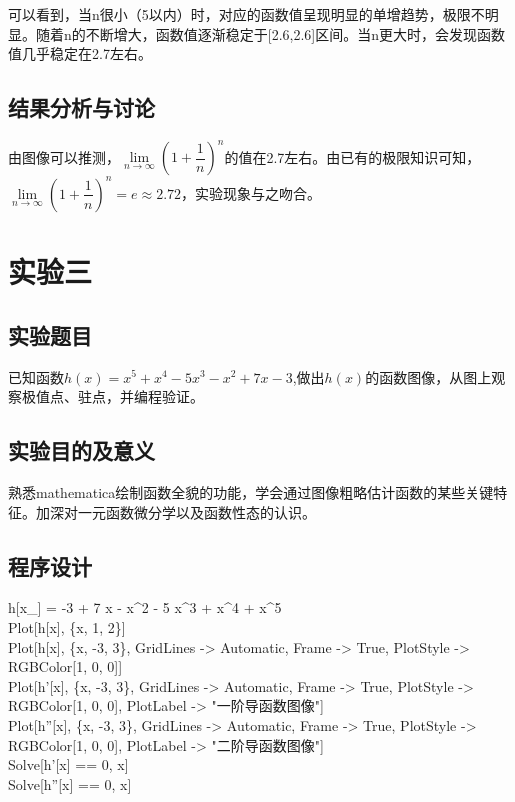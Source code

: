 \documentclass{ctexart}
\begin{document}
\begin{center}
\end{center}

可以看到，当n很小（5以内）时，对应的函数值呈现明显的单增趋势，极限不明显。随着n的不断增大，函数值逐渐稳定于[2.6,2.6]区间。当n更大时，会发现函数值几乎稳定在2.7左右。
\subsection{结果分析与讨论}
由图像可以推测，$\lim\limits_{n\to\infty}(1+\dfrac{1}{n})^n$的值在2.7左右。由已有的极限知识可知，$\lim\limits_{n\to\infty}(1+\dfrac{1}{n})^n=e\approx 2.72$，实验现象与之吻合。
\section{实验三}
\subsection{实验题目}
已知函数$h(x)=x^5+x^4-5x^3-x^2+7x-3$,做出$h(x)$的函数图像，从图上观察极值点、驻点，并编程验证。
\subsection{实验目的及意义}
熟悉mathematica绘制函数全貌的功能，学会通过图像粗略估计函数的某些关键特征。加深对一元函数微分学以及函数性态的认识。
\subsection{程序设计}
\noindent h[x\_] = -3 + 7 x - x\^{}2 - 5 x\^{}3 + x\^{}4 + x\^{}5\\
Plot[h[x], \{x, 1, 2\}]\\
Plot[h[x], \{x, -3, 3\}, GridLines -> Automatic, Frame -> True, 
PlotStyle -> RGBColor[1, 0, 0]]\\
Plot[h'[x], \{x, -3, 3\}, GridLines -> Automatic, Frame -> True, 
PlotStyle -> RGBColor[1, 0, 0], PlotLabel -> "一阶导函数图像"]\\
Plot[h''[x], \{x, -3, 3\}, GridLines -> Automatic, Frame -> True, 
PlotStyle -> RGBColor[1, 0, 0], PlotLabel -> "二阶导函数图像"]\\
Solve[h'[x] == 0, x]\\
Solve[h''[x] == 0, x]\\
\end{document}
